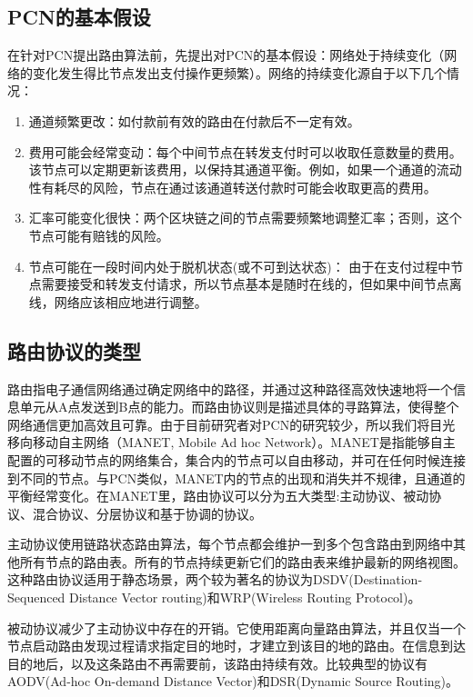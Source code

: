 \documentclass[12pt,a4paper]{article}
\begin{document}
\subsection{PCN的基本假设}
在针对PCN提出路由算法前，先提出对PCN的基本假设：网络处于持续变化（网络的变化发生得比节点发出支付操作更频繁）。网络的持续变化源自于以下几个情况：
\begin{enumerate}
	\item 通道频繁更改：如付款前有效的路由在付款后不一定有效。
	\item 费用可能会经常变动：每个中间节点在转发支付时可以收取任意数量的费用。该节点可以定期更新该费用，以保持其通道平衡。例如，如果一个通道的流动性有耗尽的风险，节点在通过该通道转送付款时可能会收取更高的费用。
	\item 汇率可能变化很快：两个区块链之间的节点需要频繁地调整汇率；否则，这个节点可能有赔钱的风险。
	\item 节点可能在一段时间内处于脱机状态(或不可到达状态)：
	由于在支付过程中节点需要接受和转发支付请求，所以节点基本是随时在线的，但如果中间节点离线，网络应该相应地进行调整。
\end{enumerate}

\subsection{路由协议的类型}
路由指电子通信网络通过确定网络中的路径，并通过这种路径高效快速地将一个信息单元从A点发送到B点的能力\cite{medhi2017network}。而路由协议则是描述具体的寻路算法，使得整个网络通信更加高效且可靠。由于目前研究者对PCN的研究较少，所以我们将目光移向移动自主网络（MANET, Mobile Ad hoc Network）。MANET是指能够自主配置的可移动节点的网络集合，集合内的节点可以自由移动，并可在任何时候连接到不同的节点。与PCN类似，MANET内的节点的出现和消失并不规律，且通道的平衡经常变化。在MANET里，路由协议可以分为五大类型:主动协议、被动协议、混合协议、分层协议和基于协调的协议。

主动协议\cite{Alslaim2014}使用链路状态路由算法，每个节点都会维护一到多个包含路由到网络中其他所有节点的路由表。所有的节点持续更新它们的路由表来维护最新的网络视图。这种路由协议适用于静态场景，两个较为著名的协议为DSDV(Destination-Sequenced Distance Vector routing)和WRP(Wireless Routing Protocol)\cite{Murthy1996}。

被动协议减少了主动协议中存在的开销。它使用距离向量路由算法，并且仅当一个节点启动路由发现过程请求指定目的地时，才建立到该目的地的路由。在信息到达目的地后，以及这条路由不再需要前，该路由持续有效。比较典型的协议有AODV(Ad-hoc On-demand Distance Vector)和DSR(Dynamic Source Routing)\cite{Johnson, Perkins1999}。
\end{document}
